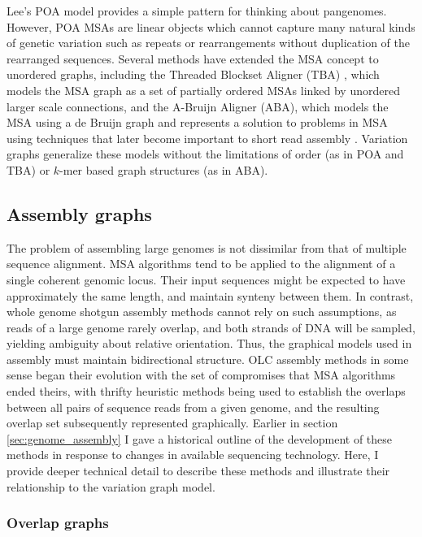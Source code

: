 Lee's POA model provides a simple pattern for thinking about pangenomes.
However, POA MSAs are linear objects which cannot capture many natural kinds of genetic variation such as repeats or rearrangements without duplication of the rearranged sequences.
Several methods have extended the MSA concept to unordered graphs, including the Threaded Blockset Aligner (TBA) \cite{blanchette2004aligning}, which models the MSA graph as a set of partially ordered MSAs linked by unordered larger scale connections, and the A-Bruijn Aligner (ABA), which models the MSA using a de Bruijn graph and represents a solution to problems in MSA using techniques that later become important to short read assembly \cite{raphael2004novel}.
Variation graphs generalize these models without the limitations of order (as in POA and TBA) or $k$-mer based graph structures (as in ABA).

\subsection{Assembly graphs}

The problem of assembling large genomes is not dissimilar from that of multiple sequence alignment.
MSA algorithms tend to be applied to the alignment of a single coherent genomic locus.
Their input sequences might be expected to have approximately the same length, and maintain synteny between them.
In contrast, whole genome shotgun assembly methods cannot rely on such assumptions, as reads of a large genome rarely overlap, and both strands of DNA will be sampled, yielding ambiguity about relative orientation.
Thus, the graphical models used in assembly must maintain bidirectional structure.
OLC assembly methods in some sense began their evolution with the set of compromises that MSA algorithms ended theirs, with thrifty heuristic methods being used to establish the overlaps between all pairs of sequence reads from a given genome, and the resulting overlap set subsequently represented graphically.
Earlier in section \ref{sec:genome_assembly} I gave a historical outline of the development of these methods in response to changes in available sequencing technology.
Here, I provide deeper technical detail to describe these methods and illustrate their relationship to the variation graph model.

\subsubsection{Overlap graphs}
\label{sec:overlap_graphs}

